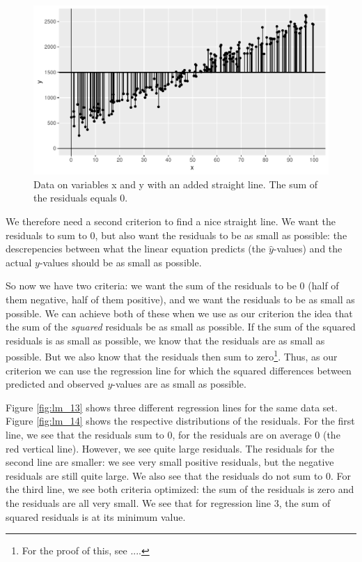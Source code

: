 \documentclass[]{report}\usepackage[]{graphicx}\usepackage[]{color}
\makeatletter
\def\maxwidth{ %
  \ifdim\Gin@nat@width>\linewidth
    \linewidth
  \else
    \Gin@nat@width
  \fi
}
\newenvironment{knitrout}{}{} %
\makeatother
\begin{document}
\begin{knitrout}
\color{fgcolor}\begin{figure}

{\centering \includegraphics[width=\maxwidth]{figure/lm_12-1} 

}

\caption[Data on variables x and y with an added straight line]{Data on variables x and y with an added straight line. The sum of the residuals equals 0.}\label{fig:lm_12}
\end{figure}


\end{knitrout}

We therefore need a second criterion to find a nice straight line. We want the residuals to sum to 0, but also want the residuals to be as small as possible: the descrepencies between what the linear equation predicts (the $\hat{y}$-values) and the actual $y$-values should be as small as possible.

So now we have two criteria: we want the sum of the residuals to be 0 (half of them negative, half of them positive), and we want the residuals to be as small as possible. We can achieve both of these when we use as our criterion the idea that the sum of the \textit{squared} residuals be as small as possible. If the sum of the squared residuals is as small as possible, we know that the residuals are as small as possible. But we also know that the residuals then sum to zero\footnote{For the proof of this, see ....}. Thus, as our criterion we can use the regression line for which the squared differences between predicted and observed $y$-values are as small as possible.

Figure \ref{fig:lm_13} shows three different regression lines for the same data set. Figure \ref{fig:lm_14} shows the respective distributions of the residuals. For the first line, we see that the residuals sum to 0, for the residuals are on average 0 (the red vertical line). However, we see quite large residuals. The residuals for the second line are smaller: we see very small positive residuals, but the negative residuals are still quite large. We also see that the residuals do not sum to 0. For the third line, we see both criteria optimized: the sum of the residuals is zero and the residuals are all very small. We see that for regression line 3, the sum of squared residuals is at its minimum value.
\end{document}
